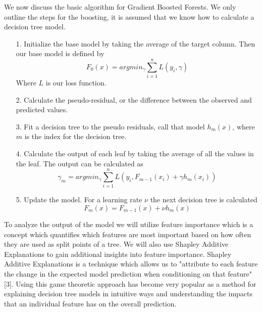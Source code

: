 \documentclass[12pt]{article}
\begin{document}
We now discuss the basic algorithm for Gradient Boosted Forests. We only outline the steps for the boosting, it is assumed that we know how to calculate a decision tree model.

\begin{enumerate} \item[1.] Initialize the base model by taking the average of the target column. Then our base model is defined by \begin{equation} F_0(x) = argmin_{\gamma} \sum_{i=1}^{n} L(y_i, \gamma) \end{equation} Where $L$ is our loss function. 

\item[2.] Calculate the pseudo-residual, or the difference between the observed and predicted values. 

\item[3.] Fit a decision tree to the pseudo residuals, call that model $h_m(x)$, where $m$ is the index for the decision tree.

\item[4.] Calculate the output of each leaf by taking the average of all the values in the leaf. The output can be calculated as \begin{equation} \gamma_m = argmin_{\gamma} \sum_{i=1}^{n} L(y_i, F_{m-1}(x_i) + \gamma h_m(x_i)) \end{equation} 

\item[5.] Update the model. For a learning rate $\nu$ the next decision tree is calculated \begin{equation} F_m(x) = F_{m-1}(x) + \nu h_m(x) \end{equation}

\end{enumerate}

To analyze the output of the model we will utilize feature importance which is a concept which quantifies which features are most important based on how often they are used as split points of a tree. We will also use Shapley Additive Explanations to gain additional insights into feature importance. Shapley Additive Explanations is a technique which allows us to "attribute to each feature the change in the expected model prediction when conditioning on that feature" [3]. Using this game theoretic approach has become very popular as a method for explaining decision tree models in intuitive ways and understanding the impacts that an individual feature has on the overall prediction. \\
\end{document}
